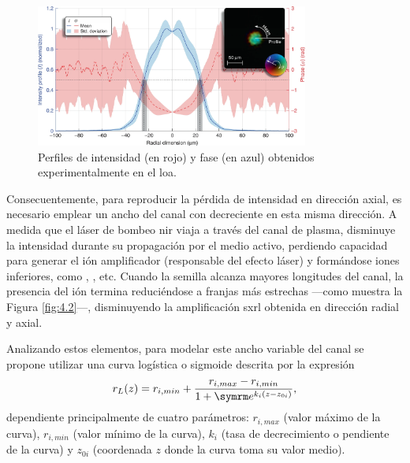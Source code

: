 \begin{figure}[htbp]
  \centering
  \includegraphics[width=0.8\textwidth]{Figuras/ch2_curvas_lab.png}
  \caption{Perfiles de intensidad (en rojo) y fase (en azul)\autocite{Tuitje2020} obtenidos experimentalmente en el \acrshort{loa}.}
  \label{fig:4.1}
\end{figure}

Consecuentemente, para reproducir la pérdida de intensidad en dirección axial, es necesario emplear un ancho del canal con  decreciente en esta misma dirección. A medida que el láser de bombeo \acrshort{nir} viaja a través del canal de plasma, disminuye la intensidad durante su propagación por el medio activo, perdiendo capacidad para generar el ión amplificador  (responsable del efecto láser) y formándose iones inferiores, como , , etc. Cuando la semilla alcanza mayores longitudes del canal, la presencia del ión termina reduciéndose a franjas más estrechas ---como muestra la Figura \ref{fig:4.2}---, disminuyendo la amplificación \acrshort{sxrl} obtenida en dirección radial y axial.

Analizando estos elementos, para modelar este ancho variable del canal se propone utilizar una curva logística o sigmoide descrita por la expresión 
\begin{equation}\label{eq:4.0}
  r_{L}(z) = r_{i,min} + \frac{r_{i,max}-r_{i,min}}{1+\eu^{k_{i}(z-z_{0i})}},
\end{equation}
dependiente principalmente de cuatro parámetros: $r_{i,max}$ (valor máximo de la curva), $r_{i,min}$ (valor mínimo de la curva), $k_{i}$ (tasa de decrecimiento o pendiente de la curva) y $z_{0i}$ (coordenada $z$ donde la curva toma su valor medio).

